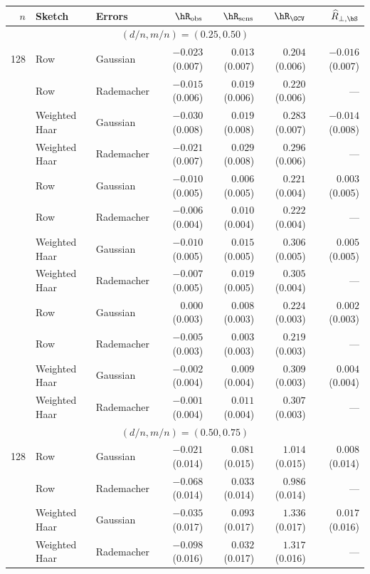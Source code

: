\begin{tabular}{@{}rllrrrr@{}}
\toprule
 $n$ & Sketch & Errors & $\hR_{\mathrm{obs}}$ & $\hR_{\mathrm{sens}}$ & $\hR_{\GCV}$ & $\widehat R_{\perp,\bS}$ \\
\midrule
\multicolumn{7}{c}{$(d/n,m/n)=(0.25,0.50)$} \\
\midrule
128 & Row & Gaussian & $-0.023$ (0.007) & $0.013$ (0.007) & $0.204$ (0.006) & $-0.016$ (0.007) \\
 & Row & Rademacher & $-0.015$ (0.006) & $0.019$ (0.006) & $0.220$ (0.006) & --- \\
 & Weighted Haar & Gaussian & $-0.030$ (0.008) & $0.019$ (0.008) & $0.283$ (0.007) & $-0.014$ (0.008) \\
 & Weighted Haar & Rademacher & $-0.021$ (0.007) & $0.029$ (0.008) & $0.296$ (0.006) & --- \\
\addlinespace[3pt]
256 & Row & Gaussian & $-0.010$ (0.005) & $0.006$ (0.005) & $0.221$ (0.004) & $0.003$ (0.005) \\
 & Row & Rademacher & $-0.006$ (0.004) & $0.010$ (0.004) & $0.222$ (0.004) & --- \\
 & Weighted Haar & Gaussian & $-0.010$ (0.005) & $0.015$ (0.005) & $0.306$ (0.005) & $0.005$ (0.005) \\
 & Weighted Haar & Rademacher & $-0.007$ (0.005) & $0.019$ (0.005) & $0.305$ (0.004) & --- \\
\addlinespace[3pt]
512 & Row & Gaussian & $0.000$ (0.003) & $0.008$ (0.003) & $0.224$ (0.003) & $0.002$ (0.003) \\
 & Row & Rademacher & $-0.005$ (0.003) & $0.003$ (0.003) & $0.219$ (0.003) & --- \\
 & Weighted Haar & Gaussian & $-0.002$ (0.004) & $0.009$ (0.004) & $0.309$ (0.003) & $0.004$ (0.004) \\
 & Weighted Haar & Rademacher & $-0.001$ (0.004) & $0.011$ (0.004) & $0.307$ (0.003) & --- \\
\midrule
\multicolumn{7}{c}{$(d/n,m/n)=(0.50,0.75)$} \\
\midrule
128 & Row & Gaussian & $-0.021$ (0.014) & $0.081$ (0.015) & $1.014$ (0.015) & $0.008$ (0.014) \\
 & Row & Rademacher & $-0.068$ (0.014) & $0.033$ (0.014) & $0.986$ (0.014) & --- \\
 & Weighted Haar & Gaussian & $-0.035$ (0.017) & $0.093$ (0.017) & $1.336$ (0.017) & $0.017$ (0.016) \\
 & Weighted Haar & Rademacher & $-0.098$ (0.016) & $0.032$ (0.017) & $1.317$ (0.016) & --- \\

\end{tabular}
